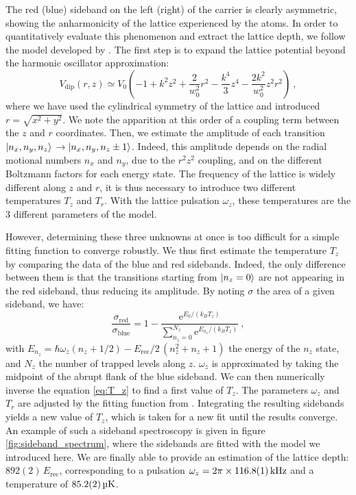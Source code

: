 \documentclass[11pt]{article}
\newcommand{\e}[1]{\text{e}^{#1}}
\numberwithin{equation}{section}
\numberwithin{figure}{section}
\begin{document}
The red (blue) sideband on the left (right) of the carrier is clearly asymmetric, showing the anharmonicity of the lattice experienced by the atoms. In order to quantitatively evaluate this phenomenon and extract the lattice depth, we follow the model developed by \cite{2009_blatt}. The first step is to expand the lattice potential beyond the harmonic oscillator approximation:
%
\begin{equation}
	V_\text{dip} (r, z) \simeq V_0 \left( -1 + k^2 z^2 + \frac{2}{w_0^2} r^2 - \frac{k^4}{3}z^4 - \frac{2k^2}{w_0^2}z^2 r^2 \right)~,
\end{equation}
%
where we have used the cylindrical symmetry of the lattice and introduced $r = \sqrt{x^2 + y^2}$. We note the apparition at this order of a coupling term between the $z$ and $r$ coordinates. Then, we estimate the amplitude of each transition $\ket{n_x, n_y, n_z} \, \rightarrow \ket{n_x, n_y, n_z \pm 1}$. Indeed, this amplitude depends on the radial motional numbers $n_x$ and $n_y$, due to the $r^2 z^2$ coupling, and on the different Boltzmann factors for each energy state. The frequency of the lattice is widely different along $z$ and $r$, it is thus necessary to introduce two different temperatures $T_z$ and $T_r$. With the lattice pulsation $\omega_z$, these temperatures are the 3 different parameters of the model. 

However, determining these three unknowns at once is too difficult for a simple fitting function to converge robustly. We thus first estimate the temperature $T_z$ by comparing the data of the blue and red sidebands. Indeed, the only difference between them is that the transitions starting from $\ket{n_z = 0}$ are not appearing in the red sideband, thus reducing its amplitude. By noting $\sigma$ the area of a given sideband, we have:
%
\begin{equation}
	\label{eq:T_z}
	\frac{\sigma_\text{red}}{\sigma_\text{blue}} = 1 - \frac{\e{E_0 / (k_B T_z)}}{\sum_{n_z=0}^{N_z} \e{E_{n_z} / (k_B T_z)}}~,
\end{equation}
%
with $E_{n_z} = \hbar \omega_z (n_z + 1/2) - E_\text{rec}/2 \,(n_z^2 + n_z + 1)$ the energy of the $n_z$ state, and $N_z$ the number of trapped levels along $z$. $\omega_z$ is approximated by taking the midpoint of the abrupt flank of the blue sideband. We can then numerically inverse the equation \eqref{eq:T_z} to find a first value of $T_z$. The parameters $\omega_z$ and $T_r$ are adjusted by the fitting function from \citet[eq. 11]{2009_blatt}. 
Integrating the resulting sidebands yields a new value of $T_z$, which is taken for a new fit until the results converge. An example of such a sideband spectroscopy is given in figure \ref{fig:sideband_spectrum}, where the sidebands are fitted with the model we introduced here. We are finally able to provide an estimation of the lattice depth: $892(2)\,E_\text{rec}$, corresponding to a pulsation $\omega_z = 2 \pi \times \SI{116.8\pm0.1}{\kilo\hertz}$ and a temperature of $\SI{85.2\pm0.2}{\micro\kelvin}$.
\end{document}

